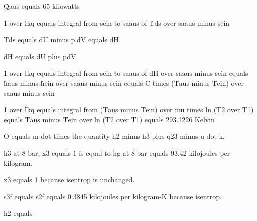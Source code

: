 Q̇aus equals 65 kilowatts

1 over İkq equals integral from sein to saaus of Ṫds over saaus minus sein

Ṫds equals dU minus p.dV equals dH

dH equals dU plus pdV

1 over İkq equals integral from sein to saaus of dH over saaus minus sein equals ḣaus minus ḣein over saaus minus sein equals C times (Ṫaus minus Ṫein) over saaus minus sein

1 over İkq equals integral from (Ṫaus minus Ṫein) over mu times ln (T2 over T1) equals Ṫaus minus Ṫein over ln (T2 over T1) equals 293.1226 Kelvin

O equals m dot times the quantity h2 minus h3 plus q23 minus u dot k.

h3 at 8 bar, x3 equals 1 is equal to hg at 8 bar equals 93.42 kilojoules per kilogram.

x3 equals 1 because isentrop is unchanged.

s3f equals s2f equals 0.3845 kilojoules per kilogram-K because isentrop.

h2 equals